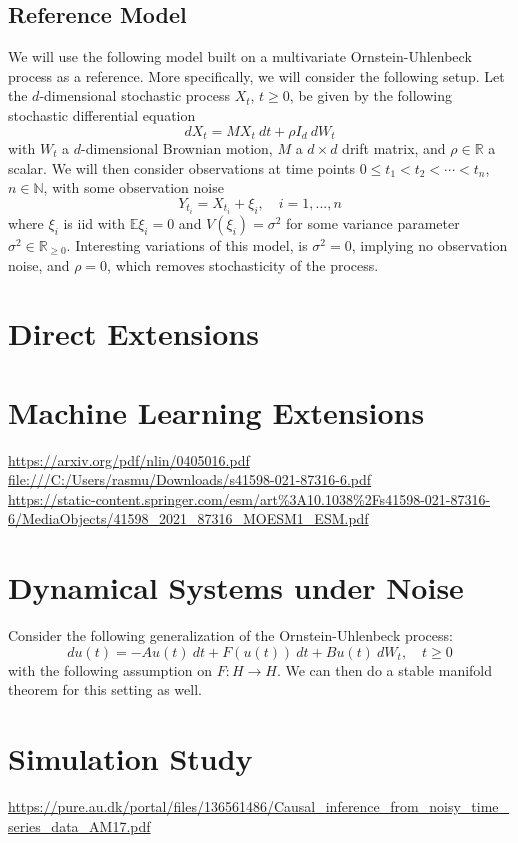 \documentclass[11pt, a4paper]{memoir}
\theoremstyle{break}
\theoremstyle{break}
\theoremstyle{nonumberplain}
\begin{document}
\subsection*{Reference Model}
We will use the following model built on a multivariate Ornstein-Uhlenbeck process as a reference. More specifically, we will consider the following setup. Let the $d$-dimensional stochastic process $X_t$, $t\geqslant 0$, be given by the following stochastic differential equation
$$dX_t=M X_t\ dt+\rho I_d\ dW_t$$
with $W_t$ a $d$-dimensional  Brownian motion, $M$ a $d\times d$ drift matrix, and $\rho\in \mathbb{R}$ a scalar. We will then consider observations at time points $0\leqslant t_1<t_2<\cdots <t_n$, $n\in \mathbb{N}$, with some observation noise
$$Y_{t_i}=X_{t_i}+\xi_i,\quad i=1,...,n$$
where $\xi_i$ is iid with $\mathbb{E} \xi_i=0$ and $V(\xi_i)=\sigma^2$ for some variance parameter $\sigma^2\in \mathbb{R}_{\geqslant 0}$. Interesting variations of this model, is $\sigma^2=0$, implying no observation noise, and $\rho=0$, which removes stochasticity of the process.
\section{Direct Extensions}


\section{Machine Learning Extensions}
\url{https://arxiv.org/pdf/nlin/0405016.pdf}\\[5pt]
\url{file:///C:/Users/rasmu/Downloads/s41598-021-87316-6.pdf}\\[5pt]
\url{https://static-content.springer.com/esm/art%3A10.1038%2Fs41598-021-87316-6/MediaObjects/41598_2021_87316_MOESM1_ESM.pdf}

\section{Dynamical Systems under Noise}
Consider the following generalization of the Ornstein-Uhlenbeck process:
$$du(t)=-Au(t)\ dt+F(u(t))\ dt+B u(t)\ dW_t,\quad t\geqslant 0$$
with the following assumption on $F:H\to H$. We can then do a stable manifold theorem for this setting as well.
\cite{StableManifoldStoc} 

\section{Simulation Study}
\url{https://pure.au.dk/portal/files/136561486/Causal_inference_from_noisy_time_series_data_AM17.pdf}






\end{document}
